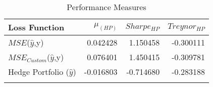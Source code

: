 \begin{table}[H]
     \centering
     \begin{tabular}{lrrr}
          \toprule
          Loss Function   & $\mu_{(HP)}$   & $Sharpe_{HP}$ & $Treynor_{HP}$ \\
          \midrule
          $MSE$($\hat{y}$,y)            & 0.042428  & 1.150458     & -0.300111     \\
          $MSE_{Custom}$($\hat{y}$,y)    & 0.076401  & 1.450415     & -0.309781     \\
          Hedge Portfolio ($\hat{y}$) & -0.016803 & -0.714680    & -0.283188     \\[1ex]
          \bottomrule                         \\
     \end{tabular}
     \caption{Performance Measures}
     \label{performance-metrics}
\end{table}